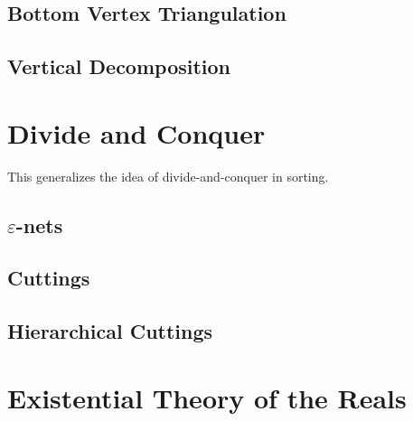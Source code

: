 \subsection{Bottom Vertex Triangulation}


\subsection{Vertical Decomposition}



\section{Divide and Conquer}

This generalizes the idea of divide-and-conquer in sorting.

\subsection{\(\varepsilon\)-nets}


\subsection{Cuttings}


\subsection{Hierarchical Cuttings}


\section{Existential Theory of the Reals}

